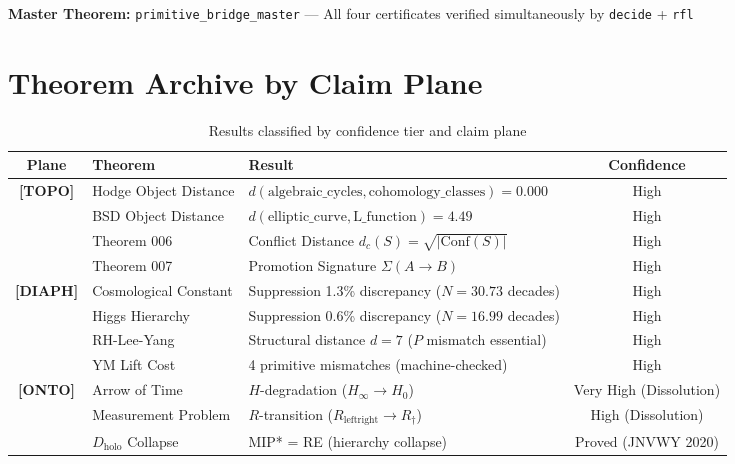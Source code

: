 \documentclass[11pt,a4paper]{article}
\begin{document}
\noindent \textbf{Master Theorem:} \texttt{primitive\_bridge\_master} — All four certificates verified simultaneously by \texttt{decide} + \texttt{rfl}

\section{Theorem Archive by Claim Plane}

\begin{table}[h!]
\centering
\caption{Results classified by confidence tier and claim plane}
\label{tab:theorems}
\begin{tabular}{c l l c}
\toprule
\textbf{Plane} & \textbf{Theorem} & \textbf{Result} & \textbf{Confidence} \\
\midrule
\multirow{4}{*}{\textbf{[TOPO]}} & Hodge Object Distance & $d(\text{algebraic\_cycles}, \text{cohomology\_classes}) = \mathbf{0.000}$ & High \\
& BSD Object Distance & $d(\text{elliptic\_curve}, \text{L\_function}) = \mathbf{4.49}$ & High \\
& Theorem 006 & Conflict Distance $d_c(S) = \sqrt{|\text{Conf}(S)|}$ & High \\
& Theorem 007 & Promotion Signature $\Sigma(A{\to}B)$ & High \\
\midrule
\multirow{4}{*}{\textbf{[DIAPH]}} & Cosmological Constant & Suppression 1.3\% discrepancy ($N{=}30.73$ decades) & High \\
& Higgs Hierarchy & Suppression 0.6\% discrepancy ($N{=}16.99$ decades) & High \\
& RH-Lee-Yang & Structural distance $d{=}7$ ($P$ mismatch essential) & High \\
& YM Lift Cost & 4 primitive mismatches (machine-checked) & High \\
\midrule
\multirow{3}{*}{\textbf{[ONTO]}} & Arrow of Time & $H$-degradation ($H_\infty \to H_0$) & Very High (Dissolution) \\
& Measurement Problem & $R$-transition ($R_{\text{leftright}} \to R_{\dagger}$) & High (Dissolution) \\
& $D_{\text{holo}}$ Collapse & MIP* = RE (hierarchy collapse) & Proved (JNVWY 2020) \\
\bottomrule
\end{tabular}
\end{table}
\end{document}
